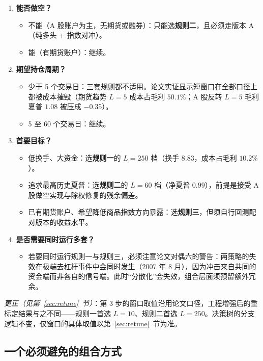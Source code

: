 \begin{enumerate}[leftmargin=2.2em]
  \item \textbf{能否做空？}
  \begin{itemize}[leftmargin=1.8em]
    \item 不能（A 股账户为主，无期货或融券）：只能选\textbf{规则二}，且必须走版本 A（纯多头 + 指数对冲）。
    \item 能（有期货账户）：继续。
  \end{itemize}
  \item \textbf{期望持仓周期？}
  \begin{itemize}[leftmargin=1.8em]
    \item 少于 5 个交易日：三套规则都不适用。论文实证显示短窗口在全部口径上都被成本摧毁（期货趋势 $L=5$ 成本占毛利 $50.1\%$；A 股反转 $L=5$ 毛利夏普 $1.08$ 被压成 $-0.35$）。
    \item 5 至 60 个交易日：继续。
  \end{itemize}
  \item \textbf{首要目标？}
  \begin{itemize}[leftmargin=1.8em]
    \item 低换手、大资金：选\textbf{规则一}的 $L=250$ 档（换手 $8.83$，成本占毛利 $10.2\%$）。
    \item 追求最高历史夏普：选\textbf{规则二}的 $L=60$ 档（净夏普 $0.99$），前提是接受 A 股做空实现与除权修复的残余偏差。
    \item 已有期货账户、希望降低商品指数方向暴露：选\textbf{规则三}，但须自行回测配对版本的收益水平。
  \end{itemize}
  \item \textbf{是否需要同时运行多套？}
  \begin{itemize}[leftmargin=1.8em]
    \item 若要同时运行规则一与规则三，必须注意论文对偶六的警告：两策略的失效在极端去杠杆事件中会同时发生（2007 年 8 月），因为冲击来自共同的资金端而非各自的信号端。此时“分散化”会失效，组合层面须预留额外冗余。
  \end{itemize}
\end{enumerate}

\emph{更正（见第~\ref{sec:retune}~节）}：第 3 步的窗口取值沿用论文口径，工程增强后的重标定结果与之不同——规则一首选 $L=10$、规则二首选 $L=250$。决策树的分支逻辑不变，仅窗口的具体取值以第~\ref{sec:retune}~节为准。

\subsection{一个必须避免的组合方式}

